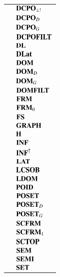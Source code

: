 {{\begin{footnotesize}
\begin{longtable}{ll}
\code{$\CatDCPOps$}   & $\CatDCPOps$        \\
\code{$\CatDCPOD$}    & $\CatDCPOD$         \\
\code{$\CatDCPOG$}    & $\CatDCPOG$         \\
\code{$\CatDCPOFILT$} & $\CatDCPOFILT$      \\
\code{$\CatDL$}       & $\CatDL$            \\
\code{$\CatDLat$}     & $\CatDLat$          \\
\code{$\CatDOM$}      & $\CatDOM$           \\
\code{$\CatDOMD$}     & $\CatDOMD$          \\
\code{$\CatDOMG$}     & $\CatDOMG$          \\
\code{$\CatDOMFILT$}  & $\CatDOMFILT$       \\
\code{$\CatFRM$}      & $\CatFRM$           \\
\code{$\CatFRMz$}     & $\CatFRMz$          \\
\code{$\CatFS$}       & $\CatFS$            \\
\code{$\CatGRAPH$}    & $\CatGRAPH$         \\
\code{$\CatH$}        & $\CatH$             \\
\code{$\CatINF$}      & $\CatINF$           \\
\code{$\CatINFup$}    & $\CatINFup$         \\
\code{$\CatLAT$}      & $\CatLAT$           \\
\code{$\CatLCSOB$}    & $\CatLCSOB$         \\
\code{$\CatLDOM$}     & $\CatLDOM$          \\
\code{$\CatPOID$}     & $\CatPOID$          \\
\code{$\CatPOSET$}    & $\CatPOSET$         \\
\code{$\CatPOSETD$}   & $\CatPOSETD$        \\
\code{$\CatPOSETG$}   & $\CatPOSETG$        \\
\code{$\CatSCFRM$}    & $\CatSCFRM$         \\
\code{$\CatSCFRMi$}   & $\CatSCFRMi$        \\
\code{$\CatSCTOP$}    & $\CatSCTOP$         \\
\code{$\CatSEM$}      & $\CatSEM$           \\
\code{$\CatSEMI$}     & $\CatSEMI$          \\
\code{$\CatSET$}      & $\CatSET$           \\

\end{longtable}
\end{footnotesize}}}
